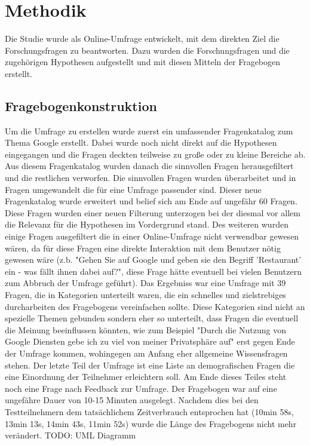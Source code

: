 %
% 

\chapter{Methodik}

Die Studie wurde als Online-Umfrage entwickelt, mit dem direkten Ziel die Forschungsfragen zu beantworten. Dazu wurden die Forschungsfragen und die zugehörigen Hypothesen aufgestellt und mit diesen Mitteln der Fragebogen erstellt.

\section{Fragebogenkonstruktion}
Um die Umfrage zu erstellen wurde zuerst ein umfassender Fragenkatalog zum Thema Google erstellt. Dabei wurde noch nicht direkt auf die Hypothesen eingegangen und die Fragen deckten teilweise zu große oder zu kleine Bereiche ab. Aus diesem Fragenkatalog wurden danach die sinnvollen Fragen herausgefiltert und die restlichen verworfen. Die sinnvollen Fragen wurden überarbeitet und in Fragen umgewandelt die für eine Umfrage passender sind. Dieser neue Fragenkatalog wurde erweitert und belief sich am Ende auf ungefähr 60 Fragen.
Diese Fragen wurden einer neuen Filterung unterzogen bei der diesmal vor allem die Relevanz für die Hypothesen im Vordergrund stand. Des weiteren wurden einige Fragen ausgefiltert die in einer Online-Umfrage nicht verwendbar gewesen wären, da für diese Fragen eine direkte Interaktion mit dem Benutzer nötig gewesen wäre (z.b. "Gehen Sie auf Google und geben sie den Begriff 'Restaurant' ein - was fällt ihnen dabei auf?", diese Frage hätte eventuell bei vielen Benutzern zum Abbruch der Umfrage geführt). Das Ergebniss war eine Umfrage mit 39 Fragen, die in Kategorien unterteilt waren, die ein schnelles und zielstrebiges durcharbeiten des Fragebogens vereinfachen sollte. Diese Kategorien sind nicht an spezielle Themen gebunden sondern eher so unterteilt, dass Fragen die eventuell die Meinung beeinflussen könnten, wie zum Beispiel "Durch die Nutzung von Google Diensten gebe ich zu viel von meiner Privatsphäre auf" erst gegen Ende der Umfrage kommen, wohingegen am Anfang eher allgemeine Wissensfragen stehen.
Der letzte Teil der Umfrage ist eine Liste an demografischen Fragen die eine Einordnung der Teilnehmer erleichtern soll. Am Ende dieses Teiles steht noch eine Frage nach Feedback zur Umfrage.
Der Fragebogen war auf eine ungefähre Dauer von 10-15 Minuten ausgelegt. Nachdem dies bei den Testteilnehmern dem tatsächlichem Zeitverbrauch entsprochen hat (10min 58s, 13min 13s, 14min 43s, 11min 52s) wurde die Länge des Fragebogens nicht mehr verändert.
TODO: UML Diagramm

